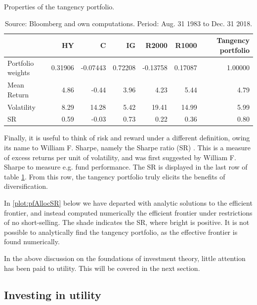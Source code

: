 \documentclass[11pt,a4paper,oneside]{article}
\begin{document}
\begin{table}[h!]
\centering
\captionsetup{justification=centering,margin=0.6cm}
\caption{Properties of the tangency portfolio.}
\label{table:CMLanalysis}
\begin{tabular}{lrrrrrr}
\toprule
{}          &    HY     &   C       &   IG      &   R2000       &   R1000   &   Tangency portfolio   \\
\midrule
Portfolio weights   &   0.31906 &  -0.07443 &   0.72208 &   -0.13758    &   0.17087 &   1.00000     \\
Mean Return         &   4.86    &  -0.44    &   3.96    &   4.23        &   5.44    &   4.79        \\
Volatility          &   8.29    &  14.28    &   5.42    &   19.41       &   14.99   &   5.99        \\
SR                  &   0.59    &  -0.03    &   0.73    &   0.22        &   0.36    &   0.80        \\
\bottomrule
\end{tabular}
\caption*{Source: Bloomberg and own computations.
Period: Aug. 31 1983 to Dec. 31 2018.}
\end{table}

Finally, it is useful to think of risk and reward under a different definition, owing its name to William F. Sharpe, namely the Sharpe ratio (SR) \cite{sharpe66}. This is a measure of excess returns per unit of volatility, and was first suggested by William F. Sharpe to measure e.g. fund performance. The SR is displayed in the last row of table \ref{table:CMLanalysis}. From this row, the tangency portfolio truly elicits the benefits of diversification. 

In \ref{plot:pfAllocSR} below we have departed with analytic solutions to the efficient frontier, and instead computed numerically the efficient frontier under restrictions of no short-selling. The shade indicates the SR, where bright is positive. It is not possible to analytically find the tangency portfolio, as the effective frontier is found numerically.



In the above discussion on the foundations of investment theory, little attention has been paid to utility. This will be covered in the next section.

\subsection{Investing in utility}


\printbibliography[heading=none]
\end{document}

